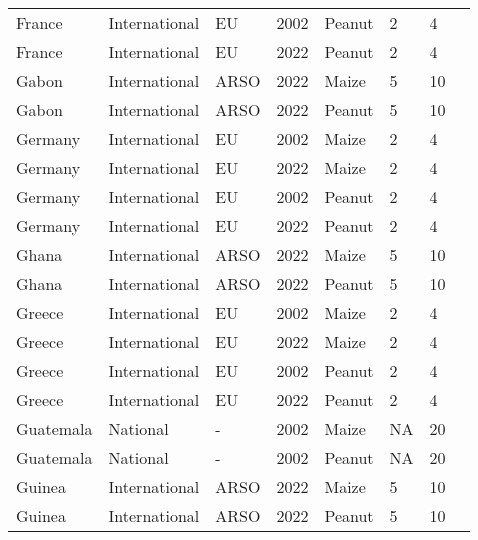 \begin{landscape}
\begin{longtable}[c]{llllllll}
France            & International & EU       & 2002 & Peanut & 2  & 4  & \citet{EC2010}               \\
France            & International & EU       & 2022 & Peanut & 2  & 4  & \citet{EC2010}               \\
Gabon             & International & ARSO     & 2022 & Maize  & 5  & 10 & \citet{ARSO2022}             \\
Gabon             & International & ARSO     & 2022 & Peanut & 5  & 10 & \citet{ARSO2022}             \\
Germany           & International & EU       & 2002 & Maize  & 2  & 4  & \citet{EC2010}               \\
Germany           & International & EU       & 2022 & Maize  & 2  & 4  & \citet{EC2010}               \\
Germany           & International & EU       & 2002 & Peanut & 2  & 4  & \citet{EC2010}               \\
Germany           & International & EU       & 2022 & Peanut & 2  & 4  & \citet{EC2010}               \\
Ghana             & International & ARSO     & 2022 & Maize  & 5  & 10 & \citet{ARSO2022}             \\
Ghana             & International & ARSO     & 2022 & Peanut & 5  & 10 & \citet{ARSO2022}             \\
Greece            & International & EU       & 2002 & Maize  & 2  & 4  & \citet{EC2010}               \\
Greece            & International & EU       & 2022 & Maize  & 2  & 4  & \citet{EC2010}               \\
Greece            & International & EU       & 2002 & Peanut & 2  & 4  & \citet{EC2010}               \\
Greece            & International & EU       & 2022 & Peanut & 2  & 4  & \citet{EC2010}               \\
Guatemala         & National      & -        & 2002 & Maize  & NA & 20 & \citet{van2004worldwide}     \\
Guatemala         & National      & -        & 2002 & Peanut & NA & 20 & \citet{van2004worldwide}     \\
Guinea            & International & ARSO     & 2022 & Maize  & 5  & 10 & \citet{ARSO2022}             \\
Guinea            & International & ARSO     & 2022 & Peanut & 5  & 10 & \citet{ARSO2022}             \\

\end{longtable}
\end{landscape}
